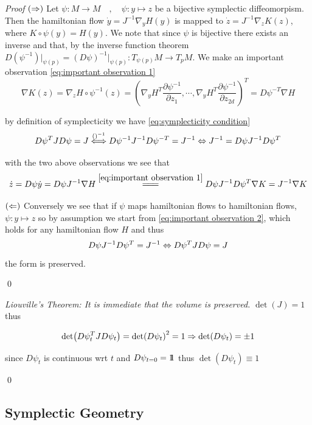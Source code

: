 \documentclass[12pt]{article}
\begin{document}
\textit{Proof} $(\Rightarrow)$ Let $\psi : M \to M \quad,\quad \psi : y\mapsto z$ be a bijective symplectic diffeomorpism. Then the hamiltonian flow $\dot y = J^{-1}\nabla_y H(y)$ is mapped to $\dot z = J^{-1}\nabla_z K(z)$, where $K \circ \psi(y) = H(y)$. We note that since $\psi$ is bijective there exists an inverse and that, by the inverse function theorem $D(\psi^{-1})\Big|_{\psi(p)} = (D\psi)^{-1}\Big|_{\psi(p)} : T_{\psi(p)}M \to T_pM$. We make an important observation \eqref{eq:important observation 1}
\begin{equation}\label{eq:important observation 1}
    \nabla K(z) = \nabla_z H\circ \psi^{-1}(z) = \left(\nabla_y H^T \frac{\partial \psi^{-1}}{\partial z_1},\cdots , \nabla_yH^T \frac{\partial \psi^{-1}}{\partial z_{2d}}\right)^T = D\psi^{-T} \nabla H
\end{equation}

by definition of symplecticity we have \eqref{eq:symplecticity condition}
\begin{equation}\label{eq:symplecticity condition}
    D\psi^TJD\psi = J \stackrel{()^{-1}}{\Longleftrightarrow} D\psi^{-1}J^{-1}D\psi^{-T} = J^{-1} \Leftrightarrow J^{-1} = D\psi J^{-1} D\psi^T
\end{equation}

with the two above observations we see that 
\begin{equation}\label{eq:important observation 2}
    \dot z = D\psi \dot y = D\psi J^{-1}\nabla H \overset{\eqref{eq:important observation 1}}{\longlongeq} D\psi J^{-1} D\psi^T \nabla K = J^{-1}\nabla K
\end{equation}

$(\Leftarrow)$ Conversely we see that if $\psi$ maps hamiltonian flows to hamiltonian flows, $\psi : y\mapsto z$ so by assumption we start from \eqref{eq:important observation 2}, which holds for any hamiltonian flow $H$ and thus
$$D\psi J^{-1}D\psi^T = J^{-1} \Leftrightarrow D\psi^T JD\psi = J$$
the form is preserved.

\qed

 \textit{Liouville's Theorem: It is immediate that the volume is preserved.} $\det(J) = 1$ thus

$$
\det(D\psi_t^TJD\psi_t) = \det(D\psi_t)^2 = 1 \Rightarrow \det(D\psi_t)=\pm 1
$$

since $D\psi_t$ is continuous wrt $t$ and $D\psi_{t=0}=1\!\!1$ thus $\det (D\psi_t)\equiv 1$

\qed\\

\subsection{Symplectic Geometry}
\end{document}
